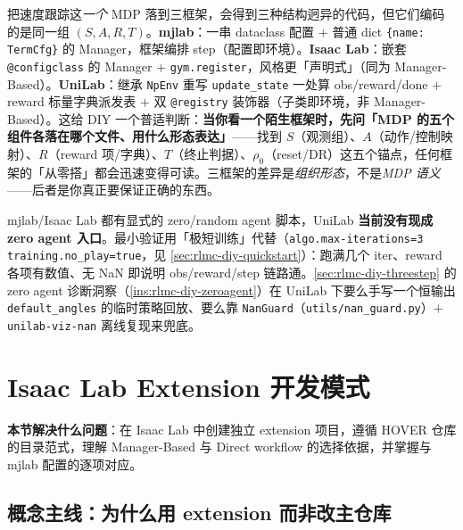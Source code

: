 \begin{insight}\label{ins:rlmc-diy-three-forms}
把速度跟踪这\emph{一个} MDP 落到三框架，会得到三种结构迥异的代码，但它们编码的是同一组 $(S,A,R,T)$。\textbf{mjlab}：一串 dataclass 配置 $+$ 普通 dict \verb|{name: TermCfg}| 的 Manager，框架编排 step（配置即环境）。\textbf{Isaac Lab}：嵌套 \verb|@configclass| 的 Manager $+$ \verb|gym.register|，风格更「声明式」（同为 Manager-Based）。\textbf{UniLab}：继承 \verb|NpEnv| 重写 \verb|update_state| 一处算 obs/reward/done $+$ reward 标量字典派发表 $+$ 双 \verb|@registry| 装饰器（子类即环境，非 Manager-Based）。这给 DIY 一个普适判断：\textbf{当你看一个陌生框架时，先问「MDP 的五个组件各落在哪个文件、用什么形态表达」}——找到 $S$（观测组）、$A$（动作/控制映射）、$R$（reward 项/字典）、$T$（终止判据）、$\rho_0$（reset/DR）这五个锚点，任何框架的「从零搭」都会迅速变得可读。三框架的差异是\emph{组织形态}，不是\emph{MDP 语义}——后者是你真正要保证正确的东西。
\end{insight}

\begin{note}
mjlab/Isaac Lab 都有显式的 zero/random agent 脚本，UniLab \textbf{当前没有现成 zero agent 入口}。最小验证用「极短训练」代替（\verb|algo.max-iterations=3 training.no_play=true|，见 \cref{sec:rlmc-diy-quickstart}）：跑满几个 iter、reward 各项有数值、无 NaN 即说明 obs/reward/step 链路通。\cref{sec:rlmc-diy-threestep} 的 zero agent 诊断洞察（\cref{ins:rlmc-diy-zeroagent}）在 UniLab 下要么手写一个恒输出 \verb|default_angles| 的临时策略回放、要么靠 \verb|NanGuard|（\verb|utils/nan_guard.py|）$+$ \verb|unilab-viz-nan| 离线复现来兜底。
\end{note}

\section{Isaac Lab Extension 开发模式}
\label{sec:rlmc-diy-isaac}

\textbf{本节解决什么问题}：在 Isaac Lab 中创建独立 extension 项目，遵循 HOVER 仓库的目录范式，理解 Manager-Based 与 Direct workflow 的选择依据，并掌握与 mjlab 配置的逐项对应。

\subsection{概念主线：为什么用 extension 而非改主仓库}
\label{sec:rlmc-diy-isaac-why}

